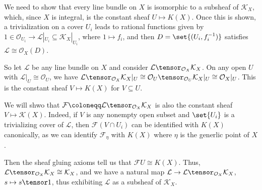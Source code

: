 We need to show that every line bundle on $X$ is isomorphic to a subsheaf
of $\mathcal{K}_X$, which, since $X$ is integral, is the constant sheaf
$U\mapsto K(X)$. Once this is shown, a trivialization on a cover $U_i$ leads
to rational functions given by $1 \in \mathcal{O}_{U_i}\to \mathcal{L}|_{U_i} \subseteq \mathcal{K}_X|_{U_i}$,
where $1\mapsto f_i$, and then $D = \set{(U_i, f_i^{-1})}$ satisfies $\mathcal{L}\cong \mathcal{O}_X(D)$.

So let $\mathcal{L}$ be any line bundle on $X$ and consider $\mathcal{L}\tensor_{\mathcal{O}_X}\mathcal{K}_X$.
On any open $U$ with $\mathcal{L}|_U\cong \mathcal{O}_U$, we have $\mathcal{L}\tensor_{\mathcal{O}_X}\mathcal{K}_X|_{U}\cong \mathcal{O}_U\tensor_{\mathcal{O}_U}\mathcal{K}_X|_U \cong \mathcal{O}_X|_U$.
This is the constant sheaf $V\mapsto K(X)$ for $V \subseteq U$.

We will shwo that $\mathcal{F}\coloneqq \mathcal{L}\tensor_{\mathcal{O}_X} \mathcal{K}_X$ is also the constant
sheaf $V\mapsto \mathcal{K}(X)$. Indeed, if $V$ is any nonempty open subset
and $\set{U_i}$ is a trivializing cover of $\mathcal{L}$, then $\mathcal{F}(V\cap U_i)$
can be identified with $K(X)$ canonically, as we can identify $\mathcal{F}_\eta$ with
$K(X)$ where $\eta$ is the generlic point of $X$.

Then the sheaf gluing axioms tell us that $\mathcal{F}U\cong K(X)$. Thus,
$\mathcal{L}\tensor_{\mathcal{O}_X}\mathcal{K}_X\cong \mathcal{K}_X$, and we have a natural
map $\mathcal{L}\to \mathcal{L}\tensor_{\mathcal{O}_X} \mathcal{K}_X$, $s\mapsto s\tensor 1$,
thus exhibiting $\mathcal{L}$ as a subsheaf of $\mathcal{K}_X$.

